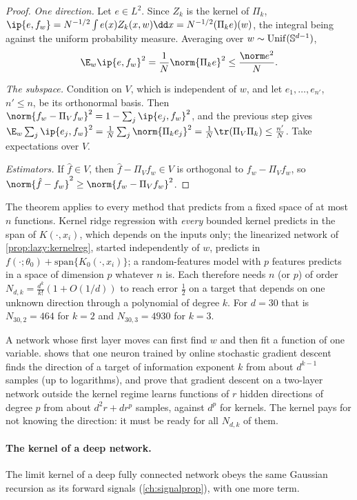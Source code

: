 \begin{refsection}
\begin{proof}
\emph{One direction.} Let $e\in L^2$. Since $Z_k$ is the kernel of $\Pi_k$, $\ip{e,f_w}=N^{-1/2}\int e(x)Z_k(x,w)\dd x=N^{-1/2}(\Pi_ke)(w)$, the integral being against the uniform probability measure. Averaging over $w\sim\operatorname{Unif}(\mathbb{S}^{d-1})$,
\[
  \E_w\ip{e,f_w}^2=\frac1N\norm{\Pi_ke}^2\le\frac{\norm e^2}N .
\]

\emph{The subspace.} Condition on $V$, which is independent of $w$, and let $e_1,\dots,e_{n'}$, $n'\le n$, be its orthonormal basis. Then $\norm{f_w-\Pi_Vf_w}^2=1-\sum_j\ip{e_j,f_w}^2$, and the previous step gives $\E_w\sum_j\ip{e_j,f_w}^2=\frac1N\sum_j\norm{\Pi_ke_j}^2=\frac1N\tr(\Pi_V\Pi_k)\le\frac{n'}N$. Take expectations over $V$.

\emph{Estimators.} If $\hat f\in V$, then $\hat f-\Pi_Vf_w\in V$ is orthogonal to $f_w-\Pi_Vf_w$, so $\norm{\hat f-f_w}^2\ge\norm{f_w-\Pi_Vf_w}^2$.
\end{proof}

The theorem applies to every method that predicts from a fixed space of at most $n$ functions. Kernel ridge regression with \emph{every} bounded kernel predicts in the span of $K(\cdot,x_i)$, which depends on the inputs only; the linearized network of \cref{prop:lazy:kernelreg}, started independently of $w$, predicts in $f(\cdot;\theta_0)+\mathrm{span}\{K_0(\cdot,x_i)\}$; a random-features model with $p$ features predicts in a space of dimension $p$ whatever $n$ is. Each therefore needs $n$ (or $p$) of order $N_{d,k}=\frac{d^k}{k!}(1+O(1/d))$ to reach error $\frac12$ on a target that depends on one unknown direction through a polynomial of degree $k$. For $d=30$ that is $N_{30,2}=464$ for $k=2$ and $N_{30,3}=4930$ for $k=3$.

A network whose first layer moves can first find $w$ and then fit a function of one variable.  shows that one neuron trained by online stochastic gradient descent finds the direction of a target of information exponent $k$ from about $d^{k-1}$ samples (up to logarithms), and \textcite{DamianEtAl2022} prove that gradient descent on a two-layer network outside the kernel regime learns functions of $r$ hidden directions of degree $p$ from about $d^2r+dr^p$ samples, against $d^p$ for kernels. The kernel pays for not knowing the direction: it must be ready for all $N_{d,k}$ of them.

\paragraph{The kernel of a deep network.} The limit kernel of a deep fully connected network obeys the same Gaussian recursion as its forward signals (\cref{ch:signalprop}), with one more term.


\end{refsection}

